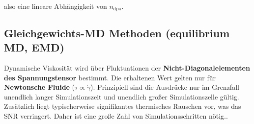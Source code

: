 \documentclass[a4paper, 10pt, 
               numbers=noenddot, toc=graduated,
               headsepline=true, footsepline=true,
               twoside=false, titlepage=true, 
               bibliography=totoc]{scrartcl}
\begin{document}
 	also eine lineare Abhängigkeit von $n_\mathrm{dpa}$.
	
	
\subsection{Gleichgewichts-MD Methoden (equilibrium MD, EMD)}
Dynamische Viskosität wird über Fluktuationen der \textbf{Nicht-Diagonalelementen des Spannungstensor} bestimmt. Die erhaltenen Wert gelten nur für \textbf{Newtonsche Fluide} ($\tau \propto \dot{\gamma}$). Prinzipiell sind die Ausdrücke nur im Grenzfall unendlich langer Simulationszeit und unendlich großer Simulationszelle gültig. Zusätzlich liegt typischerweise signifikantes thermisches Rauschen vor, was das SNR verringert. Daher ist eine große Zahl von Simulationsschritten nötig.\cite{Tenney2010}.
\end{document}
